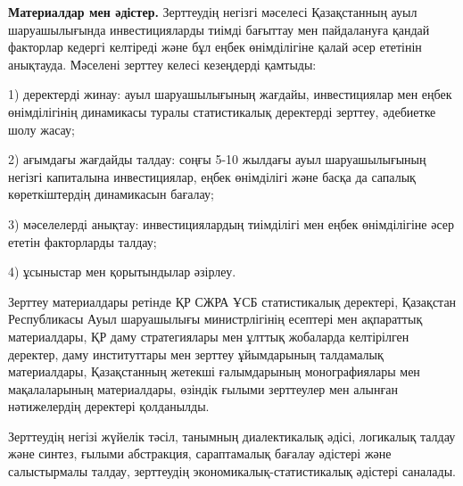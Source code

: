 {{{\bfseries Материалдар мен әдістер.} Зерттеудің негізгі мәселесі
Қазақстанның ауыл шаруашылығында инвестицияларды тиімді бағыттау мен
пайдалануға қандай факторлар кедергі келтіреді және бұл еңбек
өнімділігіне қалай әсер ететінін анықтауда. Мәселені зерттеу келесі
кезеңдерді қамтыды:

1) деректерді жинау: ауыл шаруашылығының жағдайы, инвестициялар мен
еңбек өнімділігінің динамикасы туралы статистикалық деректерді зерттеу,
әдебиетке шолу жасау;

2) ағымдағы жағдайды талдау: соңғы 5-10 жылдағы ауыл шаруашылығының
негізгі капиталына инвестициялар, еңбек өнімділігі және басқа да сапалық
көреткіштердің динамикасын бағалау;

3) мәселелерді анықтау: инвестициялардың тиімділігі мен еңбек
өнімділігіне әсер ететін факторларды талдау;

4) ұсыныстар мен қорытындылар әзірлеу.

Зерттеу материалдары ретінде ҚР СЖРА ҰСБ статистикалық деректері,
Қазақстан Республикасы Ауыл шаруашылығы министрлігінің есептері мен
ақпараттық материалдары, ҚР даму стратегиялары мен ұлттық жобаларда
келтірілген деректер, даму институттары мен зерттеу ұйымдарының
талдамалық материалдары, Қазақстанның жетекші ғалымдарының
монографиялары мен мақалаларының материалдары, өзіндік ғылыми зерттеулер
мен алынған нәтижелердің деректері қолданылды.

Зерттеудің негізі жүйелік тәсіл, танымның диалектикалық әдісі, логикалық
талдау және синтез, ғылыми абстракция, сараптамалық бағалау әдістері
және салыстырмалы талдау, зерттеудің экономикалық-статистикалық әдістері
саналады.

}}
